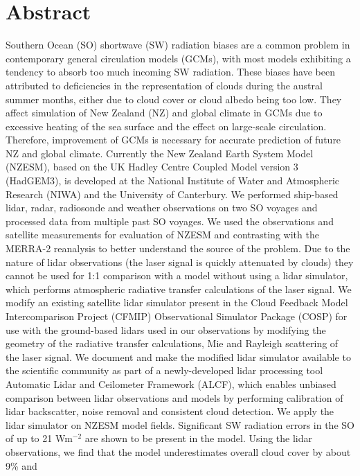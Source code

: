 \chapter*{Abstract}

\noindent
Southern Ocean (SO) shortwave (SW) radiation biases are a common
problem in contemporary general circulation models (GCMs), with most
models exhibiting a tendency to absorb too much incoming SW radiation.
These biases have been attributed to deficiencies in the representation of
clouds during the austral summer months, either due to cloud cover or cloud
albedo being too low. They affect simulation of New Zealand (NZ) and global
climate in GCMs due to excessive heating of the sea surface and the effect on
large-scale circulation. Therefore, improvement of GCMs is necessary for
accurate prediction of future NZ and global climate. Currently the New
Zealand Earth System Model (NZESM), based on the UK Hadley Centre
Coupled Model version 3 (HadGEM3), is developed at the National Institute
of Water and Atmospheric Research (NIWA) and the University of
Canterbury. We performed ship-based lidar, radar, radiosonde and weather
observations on two SO voyages and processed data from multiple past SO
voyages. We used the observations and satellite measurements for
evaluation of NZESM and contrasting with the MERRA-2 reanalysis to better
understand the source of the problem. Due to the nature of lidar
observations (the laser signal is quickly attenuated by clouds) they cannot be
used for 1:1 comparison with a model without using a lidar simulator, which
performs atmospheric radiative transfer calculations of the laser signal. We
modify an existing satellite lidar simulator present in the
Cloud Feedback Model Intercomparison Project (CFMIP)
Observational Simulator Package (COSP) for use with the ground-based lidars
used in our observations by modifying the geometry of the radiative transfer
calculations, Mie and Rayleigh scattering of the laser signal. We document
and make the modified lidar simulator available to the scientific community
as part of a newly-developed lidar processing tool Automatic Lidar and
Ceilometer Framework (ALCF), which enables unbiased comparison between
lidar observations and models by performing calibration of lidar backscatter,
noise removal and consistent cloud detection. We apply the lidar simulator
on NZESM model fields. Significant SW radiation errors in the SO of up to 21
Wm$^{-2}$ are shown to be present in the model. Using the lidar observations,
we find that the model underestimates overall cloud cover by about 9\% and
